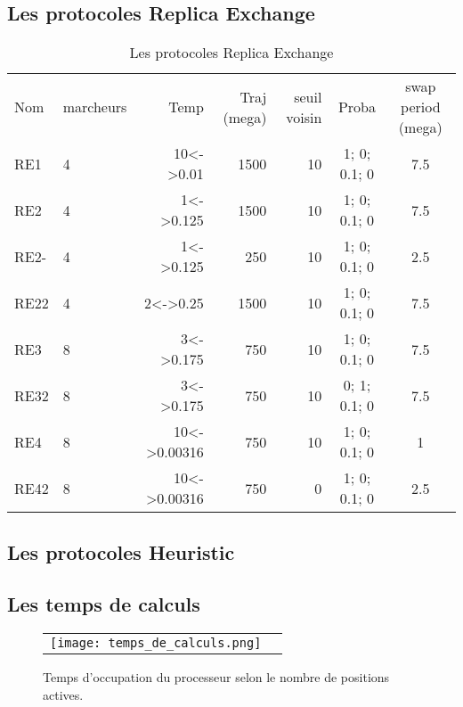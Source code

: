    \subsection{Les protocoles Replica Exchange} 
    
    \begin{table}[!htbp]
      \centering

      \begin{tabular}{llrrrcc}

        \toprule
        Nom & marcheurs &Temp & Traj (mega)& seuil voisin  & Proba & swap period (mega)\\
        \cmidrule{1-7}
        RE1   & 4 & 10<->0.01    &  1500 & 10 & 1; 0; 0.1; 0 &  7.5\\  
        RE2   & 4 & 1<->0.125    &  1500 & 10 & 1; 0; 0.1; 0 &  7.5\\  
        RE2-  & 4 & 1<->0.125    &  250  & 10 & 1; 0; 0.1; 0 &  2.5\\  
        RE22  & 4 & 2<->0.25     &  1500 & 10 & 1; 0; 0.1; 0 &  7.5\\  
        RE3   & 8 & 3<->0.175    &  750  & 10 & 1; 0; 0.1; 0 &  7.5\\
        RE32  & 8 & 3<->0.175    &  750  & 10 & 0; 1; 0.1; 0 &  7.5\\
        RE4   & 8 & 10<->0.00316 &  750  & 10 & 1; 0; 0.1; 0 &  1\\  
        RE42  & 8 & 10<->0.00316 &  750  &  0 & 1; 0; 0.1; 0 &  2.5\\  
        \bottomrule

      \end{tabular}      
      \caption{Les protocoles Replica Exchange}
\label{tab:protoRE}      
    \end{table}


   \subsection{Les protocoles Heuristic} 
    

    \clearpage
    \subsection{Les temps de calculs} 
    
    \begin{figure}[h]
      \centering
      \begin{tabular}{cc}
        \texttt{[image: temps\_de\_calculs.png]} &
      \end{tabular}
      
      \caption{Temps d'occupation du processeur selon le nombre de positions actives.}
\label{graph:temps_CPU}
    \end{figure}
    
